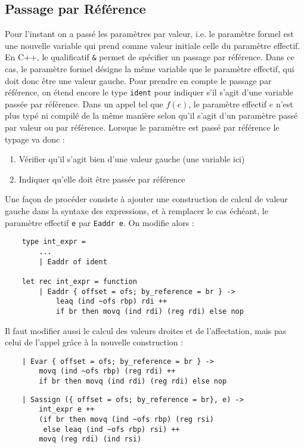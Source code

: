 \documentclass{cours}
\begin{document}
\subsection{Passage par Référence}
Pour l'instant on a passé les paramètres par valeur, i.e. le paramètre formel est une nouvelle variable qui prend comme valeur initiale celle du paramètre effectif. En C++, le qualificatif \texttt{\&} permet de spécifier un passage par référence. Dans ce cas, le paramètre formel désigne la même variable que le paramètre effectif, qui doit donc être une valeur gauche.
Pour prendre en compte le passage par référence, on étend encore le type \texttt{ident} pour indiquer s'il s'agit d'une variable passée par référence. Dans un appel tel que $f(e)$, le paramètre effectif $e$ n'est plus typé ni compilé de la même manière selon qu'il s'agit d'un paramètre passé par valeur ou par référence. Lorsque le paramètre est passé par référence le typage va donc :
\begin{enumerate}
    \item Vérifier qu'il s'agit bien d'une valeur gauche (une variable ici)
    \item Indiquer qu'elle doit être passée par référence
\end{enumerate}

Une façon de procéder consiste à ajouter une construction de calcul de valeur gauche dans la syntaxe des expressions, et à remplacer le cas échéant, le paramètre effectif \texttt{e} par \texttt{Eaddr e}.
On modifie alors :
\begin{verbatim}
    type int_expr =
        ...
        | Eaddr of ident

    let rec int_expr = function
        | Eaddr { offset = ofs; by_reference = br } ->
            leaq (ind ~ofs rbp) rdi ++
            if br then movq (ind rdi) (reg rdi) else nop

\end{verbatim}

Il faut modifier aussi le calcul des valeurs droites et de l'affectation, mais pas celui de l'appel grâce à la nouvelle construction :
\begin{verbatim}
    | Evar { offset = ofs; by_reference = br } ->
        movq (ind ~ofs rbp) (reg rdi) ++
        if br then movq (ind rdi) (reg rdi) else nop
\end{verbatim}

\begin{verbatim}
    | Sassign ({ offset = ofs; by_reference = br}, e) ->
        int_expr e ++
        (if br then movq (ind ~ofs rbp) (reg rsi)
         else leaq (ind ~ofs rbp) rsi) ++
        movq (reg rdi) (ind rsi)
\end{verbatim}
\end{document}
